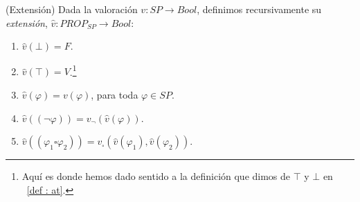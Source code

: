 \begin{definition}\label{def : ext}(Extensión) Dada la valoración $v: SP \rightarrow Bool$, definimos recursivamente su \textit{extensión}, $\hat{v}: PROP_{SP} \rightarrow Bool$:
\begin{enumerate}
    \item $\hat{v}(\bot) = F$.
    \item $\hat{v}(\top) = V$.\footnote{Aquí es donde hemos dado sentido a la definición que dimos de $\top$ y $\bot$ en ~\ref{def : at}.}
    \item $\hat{v}(\varphi) = v(\varphi)$, para toda $\varphi \in SP$.
    \item $\hat{v}((\neg \varphi)) = v_{\neg}(\hat{v}(\varphi))$.
    \item $\hat{v}((\varphi_1 \square \varphi_2)) = v_{\square}(\hat{v}(\varphi_1), \hat{v}(\varphi_2))$.
\end{enumerate}
\end{definition}


